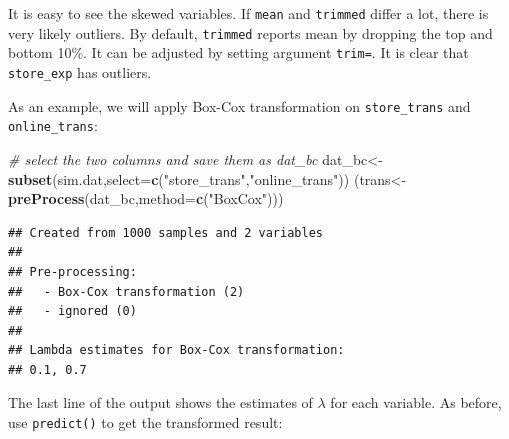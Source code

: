 \documentclass[12pt,]{krantz}
\newenvironment{Shaded}{\begin{snugshade}}{\end{snugshade}}
\newcommand{\KeywordTok}[1]{\textcolor[rgb]{0.13,0.29,0.53}{\textbf{{#1}}}}
\newcommand{\DataTypeTok}[1]{\textcolor[rgb]{0.13,0.29,0.53}{{#1}}}
\newcommand{\DecValTok}[1]{\textcolor[rgb]{0.00,0.00,0.81}{{#1}}}
\newcommand{\StringTok}[1]{\textcolor[rgb]{0.31,0.60,0.02}{{#1}}}
\newcommand{\CommentTok}[1]{\textcolor[rgb]{0.56,0.35,0.01}{\textit{{#1}}}}
\newcommand{\NormalTok}[1]{{#1}}
\theoremstyle{definition}
\theoremstyle{definition}
\theoremstyle{remark}
\begin{document}
It is easy to see the skewed variables. If \texttt{mean} and
\texttt{trimmed} differ a lot, there is very likely outliers. By
default, \texttt{trimmed} reports mean by dropping the top and bottom
10\%. It can be adjusted by setting argument \texttt{trim=}. It is clear
that \texttt{store\_exp} has outliers.

As an example, we will apply Box-Cox transformation on
\texttt{store\_trans} and \texttt{online\_trans}:

\begin{Shaded}
\begin{Highlighting}[]
\CommentTok{# select the two columns and save them as dat_bc}
\NormalTok{dat_bc<-}\KeywordTok{subset}\NormalTok{(sim.dat,}\DataTypeTok{select=}\KeywordTok{c}\NormalTok{(}\StringTok{"store_trans"}\NormalTok{,}\StringTok{"online_trans"}\NormalTok{))}
\NormalTok{(trans<-}\KeywordTok{preProcess}\NormalTok{(dat_bc,}\DataTypeTok{method=}\KeywordTok{c}\NormalTok{(}\StringTok{"BoxCox"}\NormalTok{)))}
\end{Highlighting}
\end{Shaded}

\begin{verbatim}
## Created from 1000 samples and 2 variables
## 
## Pre-processing:
##   - Box-Cox transformation (2)
##   - ignored (0)
## 
## Lambda estimates for Box-Cox transformation:
## 0.1, 0.7
\end{verbatim}

The last line of the output shows the estimates of \(\lambda\) for each
variable. As before, use \texttt{predict()} to get the transformed
result:

\begin{Shaded}
\end{Shaded}
\end{document}
